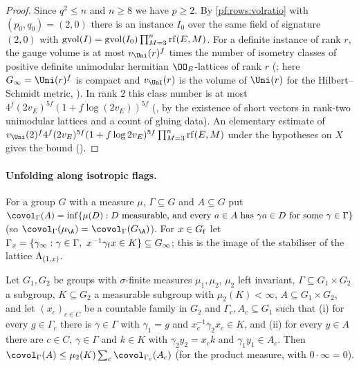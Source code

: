 \begin{proof}
Since $q^2\le n$ and $n\ge8$ we have $p\ge2$. By \cref{pf:rows:volratio} with $(p_0,q_0)=(2,0)$ there is an instance
$I_0$ over the same field of signature $(2,0)$ with $\operatorname{gvol}(I)=\operatorname{gvol}(I_0)\prod_{M=3}^{n}\operatorname{rf}(E,M)$. For a definite
instance of rank $r$, the gauge volume is at most $\rowsvU(r)^f$ times the number of isometry classes of positive definite
unimodular hermitian $\OO_E$-lattices of rank $r$ (; here
$\rowsGinf=\Uni(r)^f$ is compact and $\rowsvU(r)$ is the volume of $\Uni(r)$ for the Hilbert--Schmidt metric,
). In rank $2$ this class number is at most
$4^f(2v_E)^{5f}(1+f\log(2v_E))^{5f}$ (, by the existence of short
vectors in rank-two unimodular lattices and a count of gluing data). An elementary estimate of
$\rowsvU(2)^f4^f(2v_E)^{5f}(1+f\log 2v_E)^{5f}\prod_{M=3}^n\rowsrf(E,M)$ under the hypotheses on $X$ gives the bound
().
\end{proof}

\paragraph{Unfolding along isotropic flags.}
For a group $G$ with a measure $\mu$, $\Gamma\subseteq G$ and $A\subseteq G$ put
$\covol_\Gamma(A)=\inf\{\mu(D):D\text{ measurable, and every }a\in A\text{ has }\gamma a\in D\text{ for some }\gamma\in\Gamma\}$
(so $\covol_\Gamma(\mu_{\A})=\covol_\Gamma(\rowsGA)$). For $x\in G_{\mathrm f}$ let
$\Gamma_x=\{\gamma_\infty:\gamma\in\Gamma,\ x^{-1}\gamma_{\mathrm f}x\in K\}\subseteq\rowsGinf$; this is the image of the
stabiliser of the lattice $\Lambda_{(1,x)}$.

\begin{lemma}\label{pf:rows:slices}
Let $G_1,G_2$ be groups with $\sigma$-finite measures $\mu_1,\mu_2$, $\mu_2$ left invariant, $\Gamma\subseteq G_1\times G_2$ a
subgroup, $K\subseteq G_2$ a measurable subgroup with $\mu_2(K)<\infty$, $A\subseteq G_1\times G_2$, and let $(x_c)_{c\in C}$ be a
countable family in $G_2$ and $\Gamma_c,A_c\subseteq G_1$ such that (i) for every $g\in\Gamma_c$ there is $\gamma\in\Gamma$ with
$\gamma_1=g$ and $x_c^{-1}\gamma_2x_c\in K$, and (ii) for every $y\in A$ there are $c\in C$, $\gamma\in\Gamma$ and $k\in K$ with
$\gamma_2y_2=x_ck$ and $\gamma_1y_1\in A_c$. Then
$\covol_\Gamma(A)\le\mu_2(K)\sum_c\covol_{\Gamma_c}(A_c)$ (for the product measure, with $0\cdot\infty=0$).
\end{lemma}

